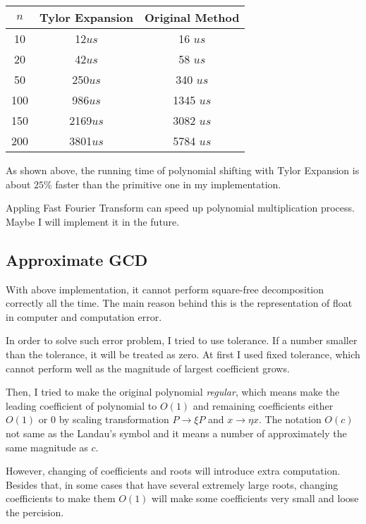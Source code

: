 \begin{center}
\label{tb1}
\begin{tabular}{ |c|c|c| } 
 \hline

 $n$  & Tylor Expansion   & Original Method\\ 

 \hline
 10   & 12$us$  & 16 $us$\\ 
 20   & 42$us$  & 58 $us$\\ 
 50   & 250$us$  & 340 $us$\\ 
 100   & 986$us$  & 1345 $us$\\ 
 150   & 2169$us$  & 3082 $us$\\ 
 200   & 3801$us$  & 5784 $us$\\ 
 \hline
\end{tabular}
\end{center}

As shown above, the running time of polynomial shifting with Tylor Expansion is
about $25\%$  faster than the primitive one in my implementation.

Appling Fast Fourier Transform can speed up polynomial multiplication process.
Maybe I will implement it in the future.

\subsection{Approximate GCD}

With above implementation, it cannot perform square-free decomposition
correctly all the time. The main reason behind this is the representation of float in
computer and computation error. 

In order to solve such error problem, I tried to use tolerance. If a number
smaller than the tolerance, it will be treated as zero. At first I used fixed
tolerance, which cannot perform well as the magnitude of largest coefficient
grows.

Then, I tried to make the original polynomial
\textit{regular}\cite{Approximate}, which means make the leading coefficient of
polynomial to $O(1)$ and remaining coefficients either $O(1)$ or $0$ by scaling
transformation $P\rightarrow \xi P $ and $x \rightarrow  \eta x$. The notation $O(c)$
not same as the Landau’s symbol and it means a number of approximately the same
magnitude as $c$.

However, changing of coefficients and roots will introduce extra computation.
Besides that, in some cases that have several extremely large roots, changing
coefficients to make them $O(1)$ will make some coefficients very small and loose the
percision. 

